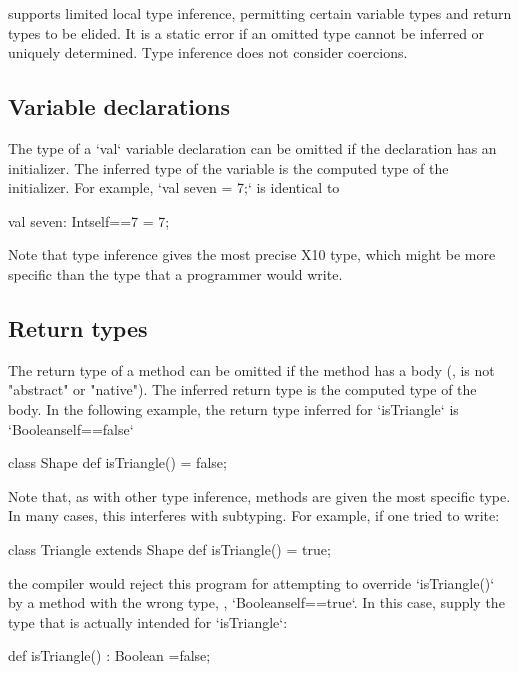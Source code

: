 {\XtenCurrVer{} supports limited local type inference, permitting
certain variable types and return types to be elided.
It is a static error if an omitted type cannot be inferred or
uniquely determined. Type inference does not consider coercions.

\subsection{Variable declarations}

The type of a \xcd`val` variable declaration can be omitted if the
declaration has an initializer.  The inferred type of the
variable is the computed type of the initializer.
For example, 
\xcd`val seven = 7;`
is identical to 
\begin{xtenmath}
val seven: Int{self==7} = 7;
\end{xtenmath}
Note that type inference gives the most precise X10 type, which might be more
specific than the type that a programmer would write.




\subsection{Return types}

The return type of a method can be omitted if the method has a body (\ie, is
not \xcd"abstract" or \xcd"native"). The inferred return type is the computed
type of the body.  In the following example, the return type inferred for
\xcd`isTriangle` is 
\xcd`Boolean{self==false}`
\begin{xten}
class Shape {
  def isTriangle() = false; 
}  
\end{xten}
%
Note that, as with other type inference, methods are given the most specific
type.  In many cases, this interferes with subtyping.  For example, if one
tried to write: 
\begin{xten}
class Triangle extends Shape {
  def isTriangle() = true;
}
\end{xten}
\noindent
the compiler would reject this program for attempting to override
\xcd`isTriangle()` by a method with the wrong type, \viz,
\xcd`Boolean{self==true}`.  In this case, supply the type that is actually
intended for \xcd`isTriangle`: 
\begin{xtenmath}
def isTriangle() : Boolean =false;
\end{xtenmath}

}
